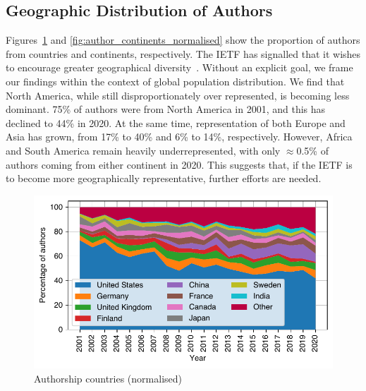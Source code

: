 \documentclass[twocolumn,10pt]{article}
\newlength{\figureWidthOneColumn}
\begin{document}
\subsection{Geographic Distribution of Authors}
Figures~\ref{fig:author_countries_normalised} and
\ref{fig:author_continents_normalised} show the proportion of authors from
countries and continents, respectively. The IETF has signalled that it
wishes to encourage greater geographical diversity~\cite{rfc7704,
ietfblog:diversity}. Without an explicit goal, we frame our findings within
the context of global population distribution.  We find that North America,
while still disproportionately over represented, is becoming less dominant.
75\% of authors were from North America in 2001, and this has declined to
44\% in 2020. At the same time, representation of both Europe and Asia has
grown, from 17\% to 40\% and 6\% to 14\%, respectively.  However, Africa
and South America remain heavily underrepresented, with only $\approx$0.5\%
of authors coming from either continent in 2020.  This suggests that, if
the IETF is to become more geographically representative, further efforts
are needed.

\begin{figure}
  \centering
  \includegraphics[width=\figureWidthOneColumn]{figures-prev/imc-2021/authors/top5_countries_normalised.pdf}
  \caption{
    Authorship countries (normalised)
  }
  \label{fig:author_countries_normalised}
\end{figure}
\end{document}
